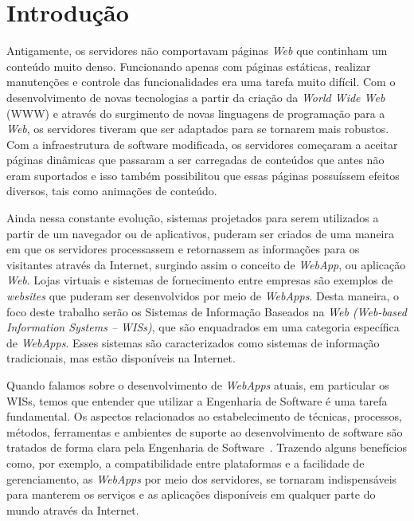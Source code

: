 \chapter{Introdução}
\label{sec-intro}

Antigamente, os servidores não comportavam páginas \textit{Web} que continham um conteúdo muito denso. Funcionando apenas com páginas estáticas, realizar manutenções e controle das funcionalidades era uma tarefa muito difícil. Com o desenvolvimento de novas tecnologias a partir da criação da \textit{World Wide Web} (WWW) e através do surgimento de novas linguagens de programação para a \textit{Web}, os servidores tiveram que ser adaptados para se tornarem mais robustos. Com a infraestrutura de software modificada, os servidores começaram a aceitar páginas dinâmicas que passaram a ser carregadas de conteúdos que antes não eram suportados e isso também possibilitou que essas páginas possuíssem efeitos diversos, tais como animações de conteúdo.

Ainda nessa constante evolução, sistemas projetados para serem utilizados a partir de um navegador ou de aplicativos, puderam ser criados de uma maneira em que os servidores processassem e retornassem as informações para os visitantes através da Internet, surgindo assim o conceito de \textit{WebApp}, ou aplicação \textit{Web}. Lojas virtuais e sistemas de fornecimento entre empresas são exemplos de \textit{websites} que puderam ser desenvolvidos por meio de \textit{WebApps}. Desta maneira, o foco deste trabalho serão os Sistemas de Informação Baseados na \textit{Web (Web-based Information Systems – WISs)}, que são enquadrados em uma categoria específica de \textit{WebApps}. Esses sistemas são caracterizados como sistemas de informação tradicionais, mas estão disponíveis na Internet.

Quando falamos sobre o desenvolvimento de \textit{WebApps} atuais, em particular os WISs, temos que entender que utilizar a Engenharia de Software é uma tarefa fundamental. Os aspectos relacionados ao estabelecimento de técnicas, processos, métodos, ferramentas e ambientes de suporte ao desenvolvimento de software são tratados de forma clara pela Engenharia de Software~\cite{falbo:es14}. Trazendo alguns benefícios como, por exemplo, a compatibilidade entre plataformas e a facilidade de gerenciamento, as \textit{WebApps} por meio dos servidores, se tornaram indispensáveis para manterem os serviços e as aplicações disponíveis em qualquer parte do mundo através da Internet.

